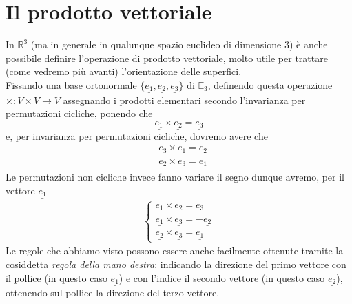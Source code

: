 \section{Il prodotto vettoriale}
\noindent In $\mathbb{R}^3$ (ma in generale in qualunque spazio euclideo di dimensione $3$) è anche possibile definire l'operazione di prodotto vettoriale, molto utile per trattare (come vedremo più avanti) l'orientazione delle superfici. \\
Fissando una base ortonormale $\{\underline{e_1}, \underline{e_2}, \underline{e_3} \}$ di $\mathbb{E}_3$, definendo questa operazione $\times: V \times V \to V$ assegnando i prodotti elementari secondo l'invarianza per permutazioni cicliche, ponendo che
%
\[\underline{e_1} \times \underline{e_2} = \underline{e_3}\]
%
e, per invarianza per permutazioni cicliche, dovremo avere che
%
\begin{align*}
&\underline{e_3} \times  \underline{e_1} = \underline{e_2} \\
&\underline{e_2} \times \underline{e_3} = \underline{e_1}
\end{align*}
%
Le permutazioni non cicliche invece fanno variare il segno dunque avremo, per il vettore $\underline{e_1}$
%
\begin{align}
	\begin{cases}
		\underline{e_1} \times \underline{e_2} = \underline{e_3} \\
		\underline{e_1} \times \underline{e_3} = - \underline{e_2} \\
		\underline{e_2} \times \underline{e_3} = \underline{e_1}
	\end{cases}
\end{align}
%
Le regole che abbiamo visto possono essere anche facilmente ottenute tramite la cosiddetta \emph{regola della mano destra}: indicando la direzione del primo vettore con il pollice (in questo caso $\underline{e_1}$) e con l'indice il secondo vettore (in questo caso $\underline{e_2}$), ottenendo sul pollice la direzione del terzo vettore. 

